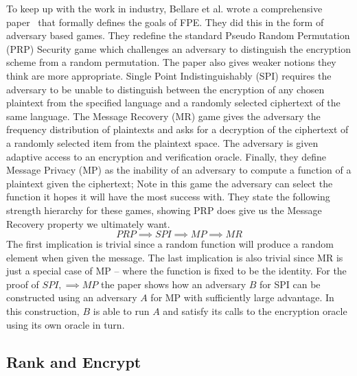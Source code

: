 \documentclass[ %
                    author={Samuel Russell},
                supervisor={Prof. Bogdan Warinschi},
                    degree={MEng},
                     title={Innocuous Ciphertexts},
                  subtitle={The DE-CENSOR Scheme},
                      type={Research},
                      year={2018} ]{dissertation}
\begin{document}
To keep up with the work in industry, Bellare et al. wrote a comprehensive paper~\cite{fpe} that formally defines the goals of FPE. They did this in the form of adversary based games. They redefine the standard Pseudo Random Permutation (PRP) Security game which challenges an adversary to distinguish the encryption scheme from a random permutation. The paper also gives weaker notions they think are more appropriate. Single Point Indistinguishably (SPI) requires the adversary to be unable to distinguish between the encryption of any chosen plaintext from the specified language and a randomly selected ciphertext of the same language. The Message Recovery (MR) game gives the adversary the frequency distribution of plaintexts and asks for a decryption of the ciphertext of a randomly selected item from the plaintext space. The adversary is given adaptive access to an encryption and verification oracle. Finally, they define Message Privacy (MP) as the inability of an adversary to compute a function of a plaintext given the ciphertext; Note in this game the adversary can select the function it hopes it will have the most success with. They state the following strength hierarchy for these games, showing PRP does give us the Message Recovery property we ultimately want.
$$ PRP \implies SPI \implies MP \implies MR $$
The first implication is trivial since a random function will produce a random element when given the message. The last implication is also trivial since MR is just a special case of MP -- where the function is fixed to be the identity. For the proof of $ SPI, \implies MP $ the paper shows how an adversary $B$ for SPI can be constructed using an adversary $A$ for MP with sufficiently large advantage. In this construction, $B$ is able to run $A$ and satisfy its calls to the encryption oracle using its own oracle in turn.

\subsection{Rank and Encrypt}
\end{document}
